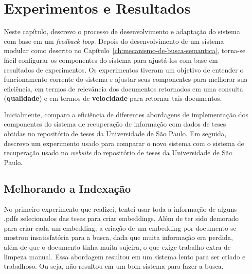 \documentclass[
	12pt,				%
	openright,			%
	oneside,			%
	a4paper,			%
	english,			%
	french,				%
	spanish,			%
	brazil				%
	]{abntex2}
\begin{document}
\chapter{Experimentos e Resultados}
\label{ch:exper}

Neste capítulo, descrevo o processo de desenvolvimento e adaptação do sistema com base em um \textit{feedback loop}.
Depois do desenvolvimento de um sistema modular como descrito no Capítulo~\ref{ch:mecanismo-de-busca-semantica}, torna-se
fácil configurar os componentes do sistema para ajustá-los com base em resultados de experimentos.
Os experimentos tiveram um objetivo de entender o funcionamento corrente do sistema e ajustar seus componentes
para melhorar sua eficiência, em termos de relevância dos documentos retornados em uma consulta (\textbf{qualidade})
e em termos de \textbf{velocidade} para retornar tais documentos.

Inicialmente, comparo a eficiência de diferentes abordagens de implementação dos componentes do sistema de recuperação
de informação com dados de teses obtidas no repositório de teses da Universidade de São Paulo.
Em seguida, descrevo um experimento usado para comparar o novo sistema com o sistema de recuperação usado no \textit{website}
do repositório de teses da Universidade de São Paulo.

\section{Melhorando a Indexação}
No primeiro experimento que realizei, tentei usar toda a informação de alguns .pdfs selecionados das teses para criar
embeddings.
Além de ter sido demorado para criar cada um embedding, a criação de um embedding por documento se mostrou insatisfatória
para a busca, dada que muita informação era perdida, além de que o documento tinha muita sujeira, o que exige trabalho
extra de limpeza manual.
Essa abordagem resultou em um sistema lento para ser criado e trabalhoso.
Ou seja, não resultou em um bom sistema para fazer a busca.
\end{document}
